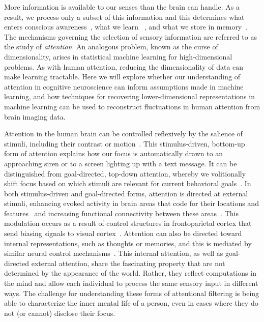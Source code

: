 
\label{sec:aim3}

More information is available to our senses than the brain can
handle. As a result, we process only a subset of this information and
this determines what enters conscious
awareness~\citep{Most:2005}, what we learn
~\citep{Turk-Browne:2005}, and what we store in
memory~\citep{Aly:2016}. The mechanisms governing the
selection of sensory information are referred to as the study of
\textit{attention}. An analogous problem, known as the curse of
dimensionality, arises in statistical machine learning for
high-dimensional problems. As with human attention, reducing the
dimensionality of data can make learning tractable. Here we will
explore whether our understanding of attention in cognitive
neuroscience can inform assumptions made in machine learning, and how
techniques for recovering lower-dimensional representations in machine
learning can be used to reconstruct fluctuations in human attention
from brain imaging data.

\biobackground{} Attention in the human brain can be controlled
reflexively by the salience of stimuli, including their 
contrast or motion~\citep{Itti:2000}. This
stimulus-driven, bottom-up form of attention explains how our focus
is automatically drawn to an approaching siren or to a screen
lighting up with a text message. It can be distinguished from
goal-directed, top-down attention, whereby we volitionally shift 
focus based on which stimuli are relevant for current behavioral
goals~\citep{Yantis:2000}. In both stimulus-driven and goal-directed
forms, attention is directed at external stimuli, enhancing evoked
activity in brain areas that code for their locations and
features~\citep{Kastner:2000} and increasing functional connectivity
between these areas~\citep{Turk-Browne:2013}. This modulation occurs
as a result of control structures in frontoparietal cortex that send
biasing signals to visual cortex~\citep{Noudoost:2010}. Attention can 
also be directed toward internal representations, such as
thoughts or memories, and this is mediated by similar
neural control mechanisms~\citep{Chun:2011}. This internal
attention, as well as goal-directed external attention, share the
fascinating property that are not determined by the appearance of the
world. Rather, they reflect computations in the mind and allow each
individual to process the same sensory input in different ways. The
challenge for understanding these forms of attentional filtering is
being able to characterize the inner mental life of a person, even in
cases where they do not (or cannot) disclose their focus.

